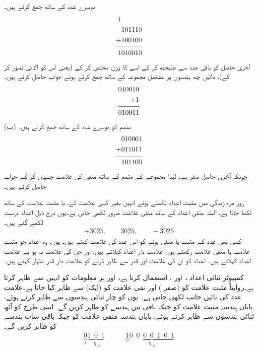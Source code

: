 دوسرے عدد کے ساتھ جمع کرتے ہیں۔
 \begin{align*}
 \begin{split}
 1\phantom{101110}&\\
 101110&\\
 +100100&\\
 \noalign{\smallskip}\hline\noalign{\smallskip}
 1010010&
 \end{split}
 \end{align*}
آخری حاصل  کو باقی عدد سے علیحدہ کر کے اسے  کا وزن مختص کر کے (یعنی اس کو اکائی تصور کر کے)، دائیں چھ ہندسوں پر مشتمل مجموعہ  کے ساتھ جمع کرتے ہوئے جواب حاصل کرتے ہیں۔
\begin{align*}
\begin{split}
010010&\\
+1&\\
 \noalign{\smallskip}\hline\noalign{\smallskip}
010011&
\end{split}
\end{align*}
(ب)
متمم  کو دوسرے عدد کے ساتھ جمع کرتے ہیں۔
\begin{align*}
\begin{split}
010001&\\
+011011&\\
 \noalign{\smallskip}\hline\noalign{\smallskip}
101100&
\end{split}
\end{align*}
چونکہ آخری حاصل صفر ہے، لہٰذا مجموعے کے متمم  کے ساتھ منفی کی علامت چسپاں کر کے جواب  حاصل کرتے ہیں۔
 
 
روز مرہ زندگی میں مثبت اعداد لکھتے ہوئے انہیں بغیر کسی علامت کے، یا مثبت علامت  کے ساتھ لکھا جاتا ہے، البتہ منفی اعداد کے ساتھ منفی علامت  ضرور لکھی جاتی ہے۔یوں درج ذیل اعداد درست لکھے گئے ہیں۔
\begin{align*}
+3025, \quad \quad 3025, \quad \quad -3025
\end{align*}
کسی بھی عدد کے مثبت یا منفی ہونے کو اس عدد کی علامت کہتے ہیں۔ یوں، وہ اعداد جو مثبت علامت  یا منفی علامت  رکھتے ہوں علامت دار اعداد کہلاتے ہیں، اور جن کی علامت نہ ہو بے علامت اعداد کہلاتے ہیں۔ اعداد کو ان کی علامت اور قدر سے ظاہر کرنے کو علامت دار قدر اظہار کہتے ہیں۔ 

کمپیوٹر ثنائی اعداد ،  اور ، استعمال کرتا ہے، اور ہر معلومات کو انہیں سے ظاہر کرتا ہے۔روایتاً مثبت علامت  کو  (صفر ) اور نفی علامت  کو  (ایک) سے ظاہر کیا جاتا ہے۔علامت عدد کی بائیں جانب لکھی جاتی ہے۔ یوں  کو چار ثنائی ہندسوں سے ظاہر کرتے ہوئے، بایاں ہندسہ مثبت علامت  کو جبکہ باقی تین ہندسے  کو ظاہر کریں گے۔ اسی طرح  کو آٹھ ثنائی ہندسوں سے ظاہر کرتے ہوئے، بایاں ہندسہ منفی علامت  کو جبکہ باقی سات ہندسے  کو ظاہر کریں گے۔ 
\begin{align*}
\underbrace{0}_{+}\underbrace{1\,\,\,0\,\,\,1}_{\,\,5_{10}}\quad \quad \quad \underbrace{1}_{-}\underbrace{0\,\,\,0\,\,\,0\,\,\,0\,\,\,1\,\,\,0\,\,\,1}_{5_{10}}
\end{align*}


